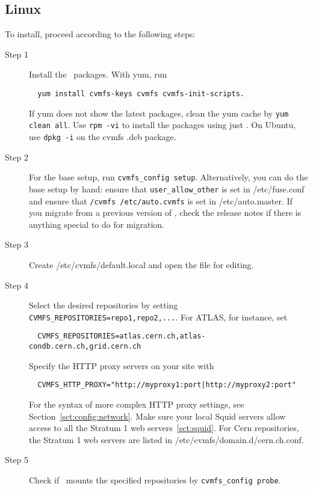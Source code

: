 \subsection{Linux}
To install, proceed according to the following steps:
\begin{description}
	\item[Step 1] Install the \cvmfs\ packages.  With yum, run
\begin{verbatim}
  yum install cvmfs-keys cvmfs cvmfs-init-scripts.
\end{verbatim}
			      If yum does not show the latest packages, clean the yum cache by \texttt{yum clean all}.
			      Use \texttt{rpm -vi} to install the packages using just \rpm.
			      On Ubuntu, use \texttt{dpkg -i} on the cvmfs .deb package.
    \item[Step 2] For the base setup, run \texttt{cvmfs\_config setup}.
    				Alternatively, you can do the base setup by hand: ensure that \texttt{user\_allow\_other} is set in /etc/fuse.conf and ensure that \texttt{/cvmfs /etc/auto.cvmfs} is set in /etc/auto.master.
					If you migrate from a previous version of \cvmfs, check the release notes if there is anything special to do for migration.
	\item[Step 3] Create /etc/cvmfs/default.local and open the file for editing.
	\item[Step 4] Select the desired repositories by setting \texttt{CVMFS\_REPOSITORIES=repo1,repo2,...}.
		For ATLAS, for instance, set 
\begin{verbatim}
  CVMFS_REPOSITORIES=atlas.cern.ch,atlas-condb.cern.ch,grid.cern.ch
\end{verbatim}
		Specify the HTTP proxy servers on your site with
\begin{verbatim}
  CVMFS_HTTP_PROXY="http://myproxy1:port|http://myproxy2:port"
\end{verbatim}
		For the syntax of more complex HTTP proxy settings, see Section~\ref{sct:config:network}.
		Make sure your local Squid servers allow access to all the Stratum 1 web servers~\ref{sct:squid}.
		For Cern repositories, the Stratum 1 web servers are listed in /etc/cvmfs/domain.d/cern.ch.conf.
	\item[Step 5] Check if \cvmfs\ mounts the specified repositories by \texttt{cvmfs\_config probe}.
\end{description}

